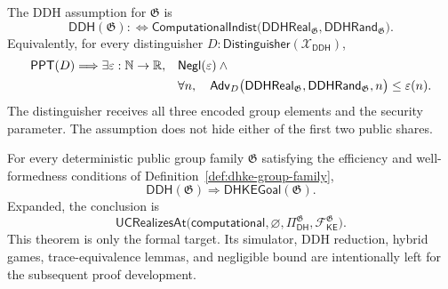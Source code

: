 \begin{definition}
\label{ass:dhke-ddh}
\notready
The DDH assumption for \(\mathfrak G\) is
\[
  \mathsf{DDH}(\mathfrak G)
  :\Longleftrightarrow
  \mathsf{ComputationalIndist}
  \bigl(
    \mathsf{DDHReal}_{\mathfrak G},
    \mathsf{DDHRand}_{\mathfrak G}
  \bigr).
\]
Equivalently, for every distinguisher
\(D:\mathsf{Distinguisher}(\mathcal X_{\mathsf{DDH}})\),
\[
\begin{aligned}
  \mathsf{PPT}(D)\Longrightarrow
  \exists\varepsilon:\mathbb{N}\to\mathbb R,\quad
  &\mathsf{Negl}(\varepsilon)\land{}\\
  &\forall n,\quad
  \mathsf{Adv}_D\bigl(
    \mathsf{DDHReal}_{\mathfrak G},
    \mathsf{DDHRand}_{\mathfrak G},n
  \bigr)
  \le\varepsilon(n).
\end{aligned}
\]
The distinguisher receives all three encoded group elements and the security
parameter.  The assumption does not hide either of the first two public shares.
\end{definition}

\begin{theorem}
\label{thm:dhke-uc-realization}
\notready
For every deterministic public group family \(\mathfrak G\) satisfying the
efficiency and well-formedness conditions of
Definition~\ref{def:dhke-group-family},
\[
  \mathsf{DDH}(\mathfrak G)
  \Longrightarrow
  \mathsf{DHKEGoal}(\mathfrak G).
\]
Expanded, the conclusion is
\[
  \mathsf{UCRealizesAt}
  \bigl(
    \mathsf{computational},
    \varnothing,
    \Pi_{\mathsf{DH}}^{\mathfrak G},
    \mathcal F_{\mathsf{KE}}^{\mathfrak G}
  \bigr).
\]
This theorem is only the formal target.  Its simulator, DDH reduction, hybrid
games, trace-equivalence lemmas, and negligible bound are intentionally left
for the subsequent proof development.
\end{theorem}
